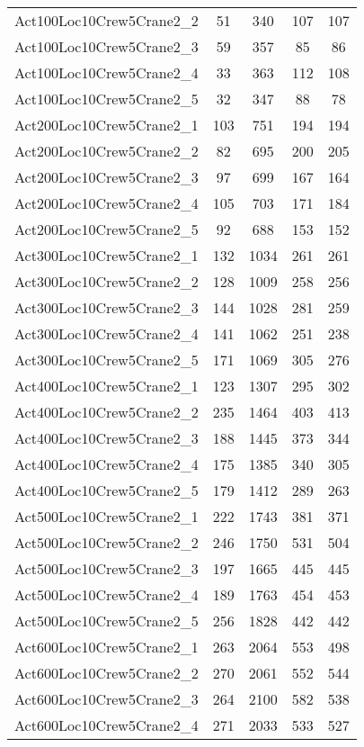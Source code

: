 \begin{center}
\begin{longtable}{ | l | c | c | c | c | }
Act100Loc10Crew5Crane2\_2	&	51	&	340	&	107	&	107	\\
Act100Loc10Crew5Crane2\_3	&	59	&	357	&	85	&	86	\\
Act100Loc10Crew5Crane2\_4	&	33	&	363	&	112	&	108	\\
Act100Loc10Crew5Crane2\_5	&	32	&	347	&	88	&	78	\\
Act200Loc10Crew5Crane2\_1	&	103	&	751	&	194	&	194	\\
Act200Loc10Crew5Crane2\_2	&	82	&	695	&	200	&	205	\\
Act200Loc10Crew5Crane2\_3	&	97	&	699	&	167	&	164	\\
Act200Loc10Crew5Crane2\_4	&	105	&	703	&	171	&	184	\\
Act200Loc10Crew5Crane2\_5	&	92	&	688	&	153	&	152	\\
Act300Loc10Crew5Crane2\_1	&	132	&	1034	&	261	&	261	\\
Act300Loc10Crew5Crane2\_2	&	128	&	1009	&	258	&	256	\\
Act300Loc10Crew5Crane2\_3	&	144	&	1028	&	281	&	259	\\
Act300Loc10Crew5Crane2\_4	&	141	&	1062	&	251	&	238	\\
Act300Loc10Crew5Crane2\_5	&	171	&	1069	&	305	&	276	\\
Act400Loc10Crew5Crane2\_1	&	123	&	1307	&	295	&	302	\\
Act400Loc10Crew5Crane2\_2	&	235	&	1464	&	403	&	413	\\
Act400Loc10Crew5Crane2\_3	&	188	&	1445	&	373	&	344	\\
Act400Loc10Crew5Crane2\_4	&	175	&	1385	&	340	&	305	\\
Act400Loc10Crew5Crane2\_5	&	179	&	1412	&	289	&	263	\\
Act500Loc10Crew5Crane2\_1	&	222	&	1743	&	381	&	371	\\
Act500Loc10Crew5Crane2\_2	&	246	&	1750	&	531	&	504	\\
Act500Loc10Crew5Crane2\_3	&	197	&	1665	&	445	&	445	\\
Act500Loc10Crew5Crane2\_4	&	189	&	1763	&	454	&	453	\\
Act500Loc10Crew5Crane2\_5	&	256	&	1828	&	442	&	442	\\
Act600Loc10Crew5Crane2\_1	&	263	&	2064	&	553	&	498	\\
Act600Loc10Crew5Crane2\_2	&	270	&	2061	&	552	&	544	\\
Act600Loc10Crew5Crane2\_3	&	264	&	2100	&	582	&	538	\\
Act600Loc10Crew5Crane2\_4	&	271	&	2033	&	533	&	527	\\

\end{longtable}
\end{center}
